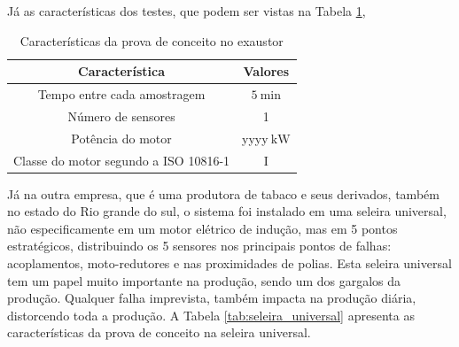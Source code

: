 Já as características dos testes, que podem ser vistas na Tabela \ref{tab:exautor}, 

\begin{table}[H]
    \caption{Características da prova de conceito no exaustor}
    \label{tab:exautor}
    \centering%
    \begin{minipage}{.55\textwidth}
      \begin{tabular*}{\textwidth}{c|c}
        \hline
        Característica                          & Valores                                    \\ \hline
        \hline
        Tempo entre cada amostragem             &  $\SI{5}{\minute}$                         \\
        Número de sensores                      &  1                                         \\ 
        Potência do motor                       &  yyyy$\SI{}{\kilo\watt}$                      \\
        Classe do motor segundo a  ISO 10816-1  &  I                                         \\
      \end{tabular*}
    \end{minipage}
  \end{table}


Já na outra empresa, que é uma produtora de tabaco e seus derivados, também no estado do Rio grande do sul, o sistema foi instalado em uma 
seleira universal, não especificamente em um motor elétrico de indução, mas em 5 pontos estratégicos, distribuindo os 5 sensores nos principais pontos 
de falhas: acoplamentos, moto-redutores e nas proximidades de polias. Esta seleira universal tem um papel muito importante na produção, sendo um dos gargalos
da produção. Qualquer falha imprevista, também impacta na produção diária, distorcendo toda a produção. A Tabela \ref{tab:seleira_universal} apresenta 
as características da prova de conceito na seleira universal.

